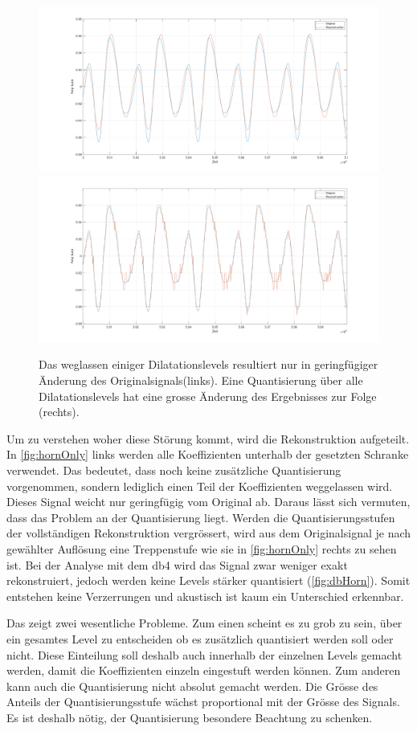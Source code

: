 \begin{refsection}
\begin{figure}
	\includegraphics[width=0.5\linewidth]{papers/compress/Bilder/hornOnlyLevs.pdf}
	\includegraphics[width=0.5\linewidth]{papers/compress/Bilder/hornOnlyQuant.pdf}
	\caption{Das weglassen einiger Dilatationslevels resultiert nur in geringfügiger Änderung des Originalsignals(links).
		Eine Quantisierung über alle Dilatationslevels hat eine grosse Änderung des Ergebnisses zur Folge (rechts).}
	\label{fig:hornOnly}
\end{figure}
Um zu verstehen woher diese Störung kommt, wird die Rekonstruktion aufgeteilt.
In \autoref{fig:hornOnly} links werden alle Koeffizienten unterhalb der gesetzten Schranke verwendet. 
Das bedeutet, dass noch keine zusätzliche Quantisierung vorgenommen, sondern lediglich einen Teil der Koeffizienten weggelassen wird.
Dieses Signal weicht nur geringfügig vom Original ab.
Daraus lässt sich vermuten, dass das Problem an der Quantisierung liegt.
Werden die Quantisierungsstufen der vollständigen Rekonstruktion vergrössert, wird aus dem Originalsignal je nach gewählter Auflösung eine Treppenstufe wie sie in \autoref{fig:hornOnly} rechts zu sehen ist.
Bei der Analyse mit dem db4 wird das Signal zwar weniger exakt rekonstruiert, jedoch werden keine Levels stärker quantisiert (\autoref{fig:dbHorn}).
Somit entstehen keine Verzerrungen und akustisch ist kaum ein Unterschied erkennbar.

Das zeigt zwei wesentliche Probleme.
Zum einen scheint es zu grob zu sein, über ein gesamtes Level zu entscheiden ob es zusätzlich quantisiert werden soll oder nicht.
Diese Einteilung soll deshalb auch innerhalb der einzelnen Levels gemacht werden, damit die Koeffizienten einzeln eingestuft werden können.
Zum anderen kann auch die Quantisierung nicht absolut gemacht werden.
Die Grösse des Anteils der Quantisierungsstufe wächst proportional mit der Grösse des Signals.
Es ist deshalb nötig, der Quantisierung besondere Beachtung zu schenken.


\end{refsection}
